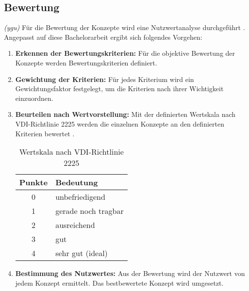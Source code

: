 \subsection{Bewertung}
\textit{(ygu)} Für die Bewertung der Konzepte wird eine Nutzwertanalyse durchgeführt \cite{naefe}. Angepasst auf diese Bachelorarbeit ergibt sich folgendes Vorgehen:

\begin{enumerate}
	\item \textbf{Erkennen der Bewertungskriterien:} Für die objektive Bewertung der Konzepte werden Bewertungskriterien definiert.
	
	\item \textbf{Gewichtung der Kriterien:} Für jedes Kriterium wird ein Gewichtungsfaktor festgelegt, um die Kriterien nach ihrer Wichtigkeit einzuordnen.
	
	\item \textbf{Beurteilen nach Wertvorstellung:} Mit der definierten Wertskala nach VDI-Richtlinie 2225 werden die einzelnen Konzepte an den definierten Kriterien bewertet \cite{vdi2225}.

\begin{table}[H]
	\begin{tabular}{|c|l|}
		\hline 
		\textbf{Punkte} & \textbf{Bedeutung} \\ 
		\hline 
		0 & unbefriedigend \\ 
		\hline 
		1 & gerade noch tragbar \\ 
		\hline 
		2 & ausreichend \\ 
		\hline 
		3 & gut \\ 
		\hline 
		4 & sehr gut (ideal) \\ 
		\hline 
	\end{tabular} 
	\caption{Wertskala nach VDI-Richtlinie 2225}
	\label{tab:wertskala}
\end{table}	
	
	
	\item \textbf{Bestimmung des Nutzwertes:} Aus der Bewertung wird der Nutzwert von jedem Konzept ermittelt. Das bestbewertete Konzept wird umgesetzt.
\end{enumerate}

